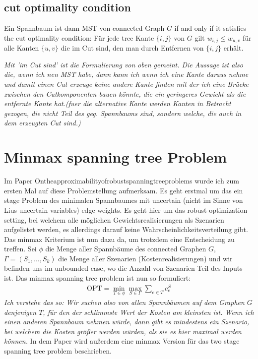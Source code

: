 \documentclass[paper=a4,10pt]{scrartcl}
\begin{document}
\subsection{cut optimality condition}
Ein Spannbaum ist dann MST von connected Graph $G$ if and only if it satisfies the cut optimality condition:
Für jede tree Kante $\{i, j\}$ von $G$ gilt $w_{i,j} \le w_{u,v}$ für alle Kanten $\{u, v\}$ die im Cut sind, den man durch Entfernen von $\{i, j\}$ erhält.

\textit{Mit 'im Cut sind' ist die Formulierung von oben gemeint. Die Aussage ist also die, wenn ich nen MST habe, dann kann ich wenn ich eine Kante daraus nehme und damit einen Cut erzeuge keine andere Kante finden mit der ich eine Brücke zwischen den Cutkomponenten bauen könnte, die ein geringeres Gewicht als die entfernte Kante hat.(fuer die alternative Kante werden Kanten in Betracht gezogen, die nicht Teil des geg. Spannbaums sind, sondern welche, die auch in dem erzeugten Cut sind.)}

\section{Minmax spanning tree Problem}
Im Paper Ontheapproximabilityofrobustspanningtreeproblems wurde ich zum ersten Mal auf diese Problemstellung aufmerksam. Es geht erstmal um das ein stage Problem des minimalen Spannbaumes mit uncertain (nicht im Sinne von Lius uncertain variables) edge weights. Es geht hier um das robust optimization setting, bei welchem alle möglichen Gewichtsrealisierungen als Szenarien aufgelistet werden, es allerdings darauf keine Wahrscheinlichkeitsverteilung gibt. Das minmax Kriterium ist nun dazu da, um trotzdem eine Entscheidung zu treffen. Sei $\phi$ die Menge aller Spannbäume des connected Graphen $G$, $\Gamma=(S_1, \dots, S_k)$ die Menge aller Szenarien (Kostenrealisierungen) und wir befinden uns im unbounded case, wo die Anzahl von Szenarien Teil des Inputs ist. Das minmax spanning tree problem ist nun so formuliert:
\begin{align}
\text{OPT} = \min_{T \in \phi} \max_{S \in \Gamma} \sum_{e \in T} c_e^S
\end{align}
\textit{Ich verstehe das so: Wir suchen also von allen Spannbäumen auf dem Graphen $G$ denjenigen $T$, für den der schlimmste Wert der Kosten am kleinsten ist. Wenn ich einen anderen Spannbaum nehmen würde, dann gibt es mindestens ein Szenario, bei welchem die Kosten größer werden würden, als sie es hier maximal werden können.}
In dem Paper wird außerdem eine minmax Version für das two stage spanning tree problem beschrieben.
\end{document}

